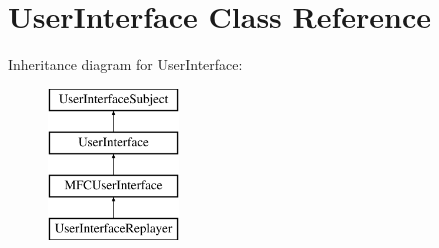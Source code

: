 \hypertarget{classUserInterface}{
\section{UserInterface Class Reference}
\label{classUserInterface}
}
Inheritance diagram for UserInterface:\begin{figure}[H]
\begin{center}
\leavevmode
\includegraphics[height=4.000000cm]{classUserInterface}
\end{center}
\end{figure}
